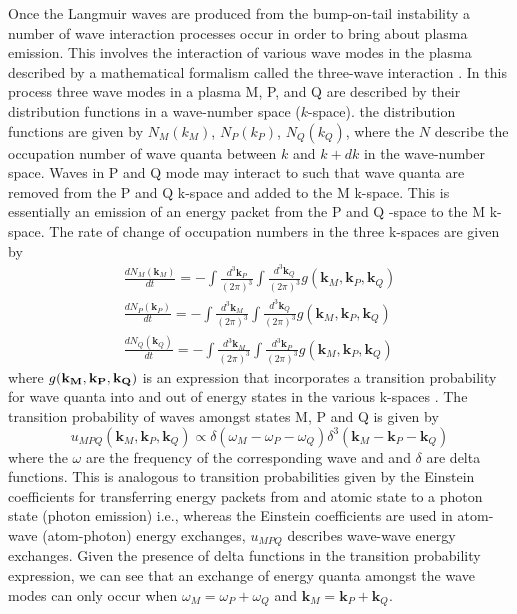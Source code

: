 Once the Langmuir waves are produced from the bump-on-tail instability a number of wave interaction processes occur in order to bring about plasma emission. This involves the interaction of various wave modes in the plasma described by a mathematical formalism called the three-wave interaction \citep{robinson1993, robinson1994}. In this process three wave modes in a plasma M, P, and Q are described by their distribution functions in a wave-number space ($k$-space). the distribution functions are given by $N_M(k_M)$, $N_P(k_P)$, $N_Q(k_Q)$, where the $N$ describe the occupation number of wave quanta between $k$ and $k+dk$ in the wave-number space. Waves in P and Q mode may interact to such that wave quanta are removed from the P and Q k-space and added to the M k-space. This is essentially an emission of an energy packet from the P and Q -space to the M k-space. The rate of change of occupation numbers in the three k-spaces are given by
\begin{eqnarray}
\frac{dN_M(\mathbf{k}_M)}{dt} = -\int \frac{d^3\mathbf{k}_P}{(2\pi)^3}\int \frac{d^3\mathbf{k}_Q}{(2\pi)^3}g(\mathbf{k}_M, \mathbf{k}_P, \mathbf{k}_Q) \\
%
\frac{dN_P(\mathbf{k}_P)}{dt} = -\int \frac{d^3\mathbf{k}_M}{(2\pi)^3}\int \frac{d^3\mathbf{k}_Q}{(2\pi)^3}g(\mathbf{k}_M, \mathbf{k}_P, \mathbf{k}_Q) \\
%
\frac{dN_Q(\mathbf{k}_Q)}{dt} = -\int \frac{d^3\mathbf{k}_M}{(2\pi)^3}\int \frac{d^3\mathbf{k}_P}{(2\pi)^3}g(\mathbf{k}_M, \mathbf{k}_P, \mathbf{k}_Q)
\end{eqnarray}
where $g(\bf{k}_M, \bf{k}_P, \bf{k}_Q)$ is an expression that incorporates a transition probability for wave quanta into and out of energy states in the various k-spaces \citep{robinson1994}. The transition probability of waves amongst states M, P and Q is given by \citep{melrose1986}
\begin{equation}
u_{MPQ}(\mathbf{k}_M, \mathbf{k}_P, \mathbf{k}_Q)  \propto \delta(\omega_M - \omega_P - \omega_Q ) \delta^3(\mathbf{k}_M - \mathbf{k}_P - \mathbf{k}_Q )
\end{equation}
where the $\omega$ are the frequency of the corresponding wave and and $\delta$ are delta functions. This is analogous to transition probabilities given by the Einstein coefficients for transferring energy packets from and atomic state to a photon state (photon emission) i.e., whereas the Einstein coefficients are used in atom-wave (atom-photon) energy exchanges, $u_{MPQ}$ describes wave-wave energy exchanges. Given the presence of delta functions in the transition probability expression, we can see that an exchange of energy quanta amongst the wave modes can only occur when $\omega_M =  \omega_P +\omega_Q$ and $\mathbf{k}_M  =  \mathbf{k}_P + \mathbf{k}_Q$.
